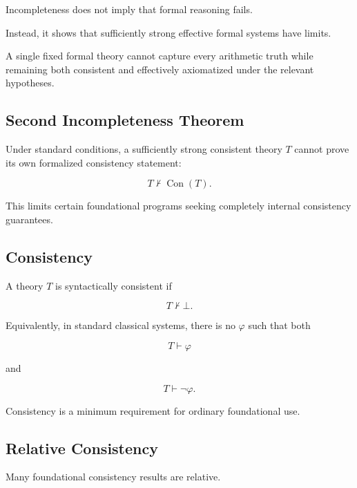 Incompleteness does not imply that formal reasoning fails.

Instead, it shows that sufficiently strong effective formal systems have
limits.

A single fixed formal theory cannot capture every arithmetic truth while
remaining both consistent and effectively axiomatized under the relevant
hypotheses.

\subsection{Second Incompleteness Theorem}
\label{subsec:foundational-second-incompleteness}

Under standard conditions, a sufficiently strong consistent theory \(T\)
cannot prove its own formalized consistency statement:

\[
\boxed{
T\nvdash\operatorname{Con}(T).
}
\]

This limits certain foundational programs seeking completely internal
consistency guarantees.

\subsection{Consistency}
\label{subsec:foundational-consistency}

A theory \(T\) is syntactically consistent if

\[
\boxed{
T\nvdash\bot.
}
\]

Equivalently, in standard classical systems, there is no \(\varphi\) such
that both

\[
T\vdash\varphi
\]

and

\[
T\vdash\neg\varphi.
\]

Consistency is a minimum requirement for ordinary foundational use.

\subsection{Relative Consistency}
\label{subsec:foundational-relative-consistency}

Many foundational consistency results are relative.

